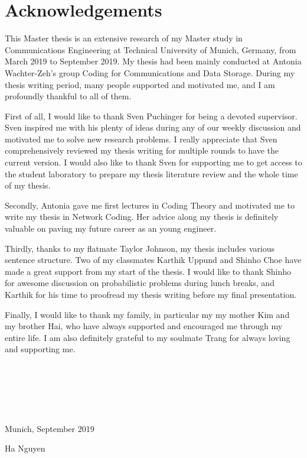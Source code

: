 \chapter*{Acknowledgements}
{This Master thesis is an extensive research of my Master study in Communications
Engineering at Technical University of Munich, Germany, from March
2019 to September 2019. My thesis had been mainly conducted at Antonia
Wachter-Zeh's group Coding for Communications and Data Storage. During
my thesis writing period, many people supported and motivated me,
and I am profoundly thankful to all of them.

First of all, I would like to thank Sven Puchinger for being a devoted
supervisor. Sven inspired me with his plenty of ideas during any of
our weekly discussion and motivated me to solve new research problems.
I really appreciate that Sven comprehensively reviewed my thesis writing
for multiple rounds to have the current version. I would also like
to thank Sven for supporting me to get access to the student laboratory
to prepare my thesis literature review and the whole time of my thesis. 

Secondly, Antonia gave me first lectures in Coding Theory and motivated
me to write my thesis in Network Coding. Her advice along my thesis
is definitely valuable on paving my future career as an young engineer.

Thirdly, thanks to my flatmate Taylor Johnson, my thesis includes
various sentence structure. Two of my classmates Karthik Uppund and
Shinho Choe have made a great support from my start of the thesis.
I would like to thank Shinho for awesome discussion on probabilistic
problems during lunch breaks, and Karthik for his time to proofread
my thesis writing before my final presentation.

Finally, I would like to thank my family, in particular my my mother
Kim and my brother Hai, who have always supported and encouraged me
through my entire life. I am also definitely grateful to my soulmate
Trang for always loving and supporting me.

~

~

~

Munich, September 2019

Ha Nguyen
}
